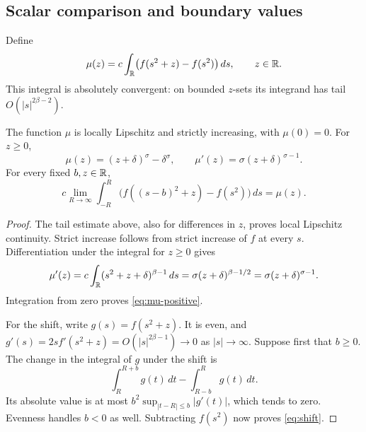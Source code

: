 \subsection{Scalar comparison and boundary values}

Define
\begin{equation}\label{eq:mu}
 \mu(z)=c\int_\mathbb R\bigl(f(s^2+z)-f(s^2)\bigr)\,ds,
 \qquad z\in\mathbb R.
\end{equation}
This integral is absolutely convergent: on bounded $z$-sets its integrand
has tail $O(|s|^{2\beta-2})$.

\begin{lemma}\label{lem:mu}
The function $\mu$ is locally Lipschitz and strictly increasing, with
$\mu(0)=0$. For $z\ge0$,
\begin{equation}\label{eq:mu-positive}
 \mu(z)=(z+\delta)^\sigma-\delta^\sigma,
 \qquad \mu'(z)=\sigma(z+\delta)^{\sigma-1}.
\end{equation}
For every fixed $b,z\in\mathbb R$,
\begin{equation}\label{eq:shift}
 c\lim_{R\to\infty}\int_{-R}^R
 \bigl(f((s-b)^2+z)-f(s^2)\bigr)\,ds=\mu(z).
\end{equation}
\end{lemma}
\begin{proof}
The tail estimate above, also for differences in $z$, proves local
Lipschitz continuity. Strict increase follows from strict increase of $f$
at every $s$. Differentiation under the integral for $z\ge0$ gives
\[
 \mu'(z)=c\int_\mathbb R(s^2+z+\delta)^{\beta-1}\,ds
 =\sigma(z+\delta)^{\beta-1/2}
 =\sigma(z+\delta)^{\sigma-1}.
\]
Integration from zero proves \eqref{eq:mu-positive}.

For the shift, write $g(s)=f(s^2+z)$. It is even, and
$g'(s)=2s f'(s^2+z)=O(|s|^{2\beta-1})\to0$ as $|s|\to\infty$.
Suppose first that $b\ge0$. The change in the integral of $g$ under the
shift is
\[
 \int_R^{R+b}g(t)\,dt-\int_{R-b}^{R}g(t)\,dt.
\]
Its absolute value is at most
$b^2\sup_{|t-R|\le b}|g'(t)|$, which tends to zero. Evenness handles
$b<0$ as well. Subtracting $f(s^2)$ now proves \eqref{eq:shift}.
\end{proof}


